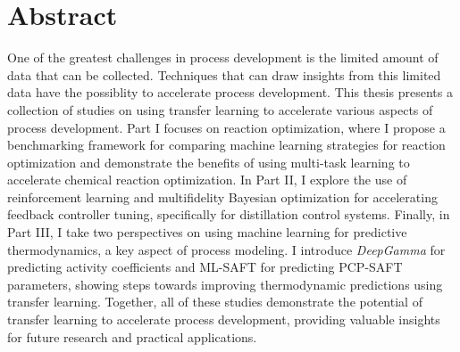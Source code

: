 \begingroup
\let\clearpage\relax
\let\cleardoublepage\relax
\let\cleardoublepage\relax

\chapter*{Abstract}

One of the greatest challenges in process development is the limited amount of data that can be collected. Techniques that can draw insights from this limited data have the possiblity to accelerate process development. This thesis presents a collection of studies on using transfer learning to accelerate various aspects of process development. Part I focuses on reaction optimization, where I propose a benchmarking framework for comparing machine learning strategies for reaction optimization and demonstrate the benefits of using multi-task learning to accelerate chemical reaction optimization. In Part II, I explore the use of reinforcement learning and multifidelity Bayesian optimization for accelerating feedback controller tuning, specifically for distillation control systems. Finally, in Part III, I take two perspectives on using machine learning for predictive thermodynamics, a key aspect of process modeling. I introduce \textit{DeepGamma} for predicting activity coefficients and ML-SAFT for predicting PCP-SAFT parameters, showing steps towards improving thermodynamic predictions using transfer learning. Together, all of these studies demonstrate the potential of transfer learning to accelerate process development, providing valuable insights for future research and practical applications.

\vfill

\endgroup			

\vfill